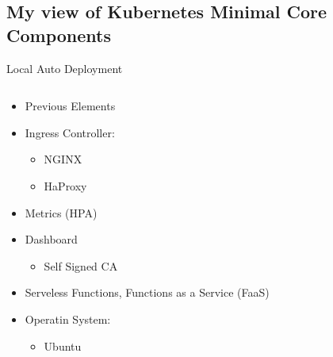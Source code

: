 \subsection{My view of Kubernetes Minimal Core Components}

\begin{frame}{Local Auto Deployment}
	\begin{columns}[T] %
		\begin{column}{5cm} %
			\begin{itemize}
				\item<+-| alert@+> Previous Elements
				\item<+-| alert@+> Ingress Controller:
					\begin{itemize}
						\item<+-| alert@+> NGINX~\cite{kubernetesNetworking}
						\item<+-| alert@+> HaProxy~\cite{kubernetesNetworking}
					\end{itemize}
				\item<+-| alert@+> Metrics (HPA)
				\item<+-| alert@+> Dashboard
					\begin{itemize}
						\item<+-| alert@+> Self Signed CA
					\end{itemize}
				\item<+-| alert@+> Serveless Functions, Functions as a Service (FaaS)
				\item<+-| alert@+> Operatin System:
					\begin{itemize}
						\item<+-| alert@+> Ubuntu
					\end{itemize}
			\end{itemize}
		\end{column}
		\begin{column}{5cm} %
		\end{column}
	\end{columns}
\end{frame}